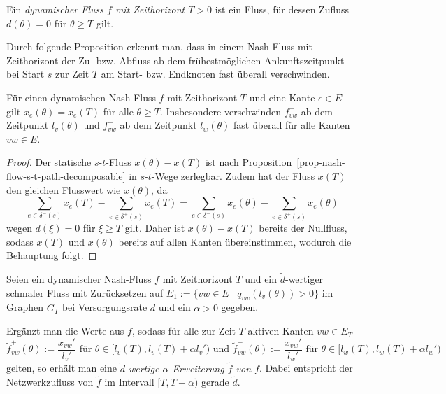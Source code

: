 \begin{definition}
	Ein \emph{dynamischer Fluss $f$ mit Zeithorizont $T>0$} ist ein Fluss, für dessen Zufluss $d(\theta)= 0$ für $\theta\geq T$ gilt.
\end{definition}

Durch folgende Proposition erkennt man, dass in einem Nash-Fluss mit Zeithorizont der Zu- bzw. Abfluss ab dem frühestmöglichen Ankunftszeitpunkt bei Start $s$ zur Zeit $T$ am Start- bzw. Endknoten fast überall verschwinden.

\begin{proposition}
Für einen dynamischen Nash-Fluss $f$ mit Zeithorizont $T$ und eine Kante $e\in E$ gilt $x_{e}(\theta) = x_{e}(T)$ für alle $\theta \geq T$.
Insbesondere verschwinden $f_{vw}^+$ ab dem Zeitpunkt $l_v(\theta)$ und $f_{vw}^-$ ab dem Zeitpunkt $l_w(\theta)$ fast überall für alle Kanten $vw\in E$.
\end{proposition}
\begin{proof}
	Der statische $s$-$t$-Fluss $x(\theta) -x(T)$ ist nach Proposition~\ref{prop-nash-flow-s-t-path-decomposable} in $s$-$t$-Wege zerlegbar.
	Zudem hat der Fluss $x(T)$ den gleichen Flusswert wie $x(\theta)$, da $$\sum_{e\in \delta^-(s)} x_e(T) - \sum_{e\in\delta^+(s)} x_e(T) = \sum_{e\in \delta^-(s)} x_e(\theta) - \sum_{e\in\delta^+(s)} x_e(\theta)$$ wegen $d(\xi) = 0$ für $\xi \geq T $ gilt.
	Daher ist $x(\theta)- x(T)$ bereits der Nullfluss, sodass $x(T)$ und $x(\theta)$ bereits auf allen Kanten übereinstimmen, wodurch die Behauptung folgt.
\end{proof}

\begin{definition}
	Seien ein dynamischer Nash-Fluss $f$ mit Zeithorizont $T$ und ein $\tilde{d}$-wertiger schmaler Fluss mit Zurücksetzen auf $E_1 := \{ vw\in E \mid q_{vw}(l_v(\theta)) > 0 \} $ im Graphen $G_T$ bei Versorgungsrate $\tilde{d}$ und ein $\alpha > 0$ gegeben.
	
	Ergänzt man die Werte aus $f$, sodass für alle zur Zeit $T$ aktiven Kanten $vw\in E_T$
	$$\tilde{f}_{vw}^+(\theta):= \frac{x_{vw}'}{l_v'} \text{ für $\theta\in [l_v(T), l_v(T)+\alpha l_v')$ und } \tilde{f}_{vw}^-(\theta):=\frac{x_{vw}'}{l_w'} \text{ für $\theta\in [l_w(T), l_w(T)+\alpha l_w')$}$$
	gelten, so erhält man eine \emph{$\tilde{d}$-wertige $\alpha$-Erweiterung $\tilde{f}$ von $f$}.
	Dabei entspricht der Netzwerkzufluss von $\tilde{f}$ im Intervall $[T, T+\alpha)$ gerade $\tilde{d}$.
\end{definition}

